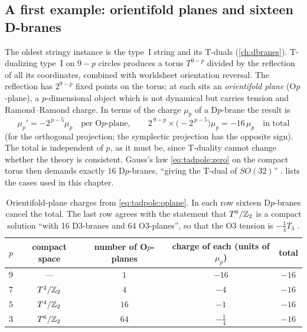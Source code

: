 \subsection{A first example: orientifold planes and sixteen D-branes}
The oldest stringy instance is the type~I string and its T-duals (\cref{ch:dbranes}).
T-dualizing type~I on $9-p$ circles produces a torus $T^{9-p}$ divided by the reflection of
all its coordinates, combined with worldsheet orientation reversal. The reflection has
$2^{9-p}$ fixed points on the torus; at each sits an \emph{orientifold plane}
(O$p$-plane), a $p$-dimensional object which is not dynamical but
carries tension and Ramond--Ramond charge. In terms of the charge $\mu_p$ of a D$p$-brane the
result is 
\begin{equation}\label{eq:tadpole:oplane}
 \mu_p'=-2^{\,p-5}\mu_p\quad\text{per O$p$-plane},\qquad
 2^{\,9-p}\times\bigl(-2^{\,p-5}\bigr)\mu_p=-16\,\mu_p\quad\text{in total}
\end{equation}
(for the orthogonal projection; the symplectic projection has the opposite sign). The total is
independent of $p$, as it must be, since T-duality cannot change whether the theory is
consistent. Gauss's law \eqref{eq:tadpole:zero} on the compact torus then demands exactly
$16$ D$p$-branes, ``giving the T-dual of $SO(32)$'' .
 lists the cases used in this chapter.

\begin{table}[t]
\centering
\begin{tabular}{@{}ccccc@{}}
\toprule
$p$ & compact space & number of O$p$-planes & charge of each (units of $\mu_p$) & total\\
\midrule
$9$ & --- & $1$ & $-16$ & $-16$\\
$7$ & $T^2/\mathbb{Z}_2$ & $4$ & $-4$ & $-16$\\
$5$ & $T^4/\mathbb{Z}_2$ & $16$ & $-1$ & $-16$\\
$3$ & $T^6/\mathbb{Z}_2$ & $64$ & $-\tfrac14$ & $-16$\\
\bottomrule
\end{tabular}
\caption{Orientifold-plane charges from \eqref{eq:tadpole:oplane}. In each row sixteen
D$p$-branes cancel the total. The last row agrees with the statement that $T^6/\mathbb{Z}_2$ is a
compact solution ``with 16 D3-branes and 64 O3-planes'', so that the O3 tension is
$-\tfrac14T_3$ .}
\label{tab:tadpole:oplanes}
\end{table}

